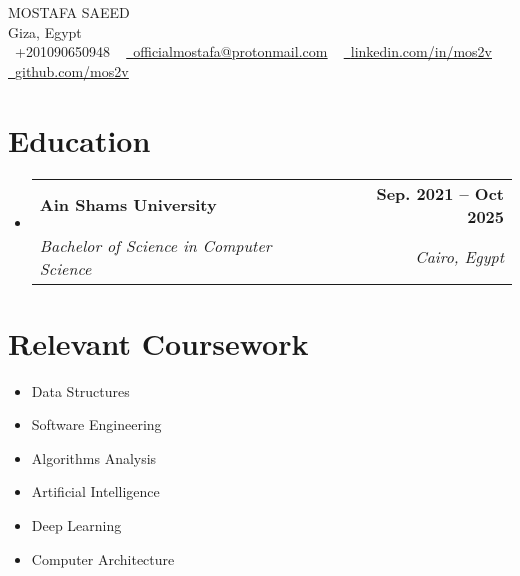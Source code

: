\documentclass[letterpaper,11pt]{article}
\makeatletter
\newcommand{\resumeSubheading}[4]{
  \vspace{-2pt}\item
    \begin{tabular*}{1.0\textwidth}[t]{l@{\extracolsep{\fill}}r}
      \textbf{#1} & \textbf{\small #2} \\
      \textit{\small#3} & \textit{\small #4} \\
    \end{tabular*}\vspace{-7pt}
}
\newcommand{\resumeSubHeadingListStart}{\begin{itemize}[leftmargin=0.0in, label={}]}
\newcommand{\resumeSubHeadingListEnd}{\end{itemize}}
\makeatother
\begin{document}

\begin{center}
    {\Huge \scshape MOSTAFA SAEED} \\ \vspace{1pt}
    Giza, Egypt \\ \vspace{1pt}
    \small \raisebox{-0.1\height}\faPhone\ +201090650948 ~ \href{mailto:officialmostafa@protonmail.com}{\raisebox{-0.2\height}\faEnvelope\  \underline{officialmostafa@protonmail.com}} ~ 
    \href{https://linkedin.com/in/mos2v}{\raisebox{-0.2\height}\faLinkedin\ \underline{linkedin.com/in/mos2v}}  ~
    \href{https://github.com/mos2v}{\raisebox{-0.2\height}\faGithub\ \underline{github.com/mos2v}}
    \vspace{-8pt}
\end{center}


\section{Education}
  \resumeSubHeadingListStart
    \resumeSubheading
      {Ain Shams University}{Sep. 2021 -- Oct 2025}
      {Bachelor of Science in Computer Science}{Cairo, Egypt}
  \resumeSubHeadingListEnd

\section{Relevant Coursework}
        \begin{multicols}{3}
            \begin{itemize}[itemsep=-5pt, parsep=3pt]
                \item\small Data Structures
                \item Software Engineering
                \item Algorithms Analysis
                \item Artificial Intelligence
                \item Deep Learning
                \item Computer Architecture
            \end{itemize}
        \end{multicols}
        \vspace*{2.0\multicolsep}
\end{document}
